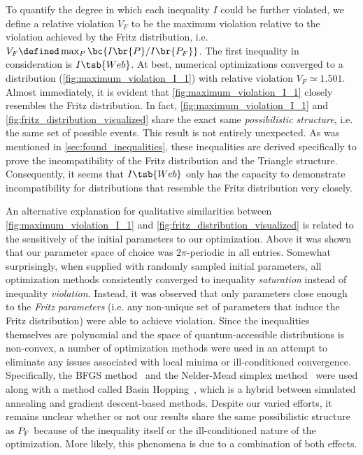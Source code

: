 \documentclass[aps, 10pt, english, twoside, pra, nofootinbib, tightenlines, longbibliography, superscriptaddress]{revtex4-1}
\begin{document}
    To quantify the degree in which each inequality $I$ could be further violated, we define a relative violation $V_F$ to be the maximum violation relative to the violation achieved by the Fritz distribution, i.e. $V_F \defined \max_{P}\bc{I\br{P}/I\br{P_F}}$. The first inequality in consideration is $I\tsb{Web}$. At best, numerical optimizations converged to a distribution (\cref{fig:maximum_violation_I_1}) with relative violation $V_F \simeq 1.501$. Almost immediately, it is evident that \cref{fig:maximum_violation_I_1} closely resembles the Fritz distribution. In fact, \cref{fig:maximum_violation_I_1} and \cref{fig:fritz_distribution_visualized} share the exact same \textit{possibilistic structure}, i.e. the same set of possible events. This result is not entirely unexpected. As was mentioned in \cref{sec:found_inequalities}, these inequalities are derived specifically to prove the incompatibility of the Fritz distribution and the Triangle structure. Consequently, it seems that $I\tsb{Web}$ only has the capacity to demonstrate incompatibility for distributions that resemble the Fritz distribution very closely.

    An alternative explanation for qualitative similarities between \cref{fig:maximum_violation_I_1} and \cref{fig:fritz_distribution_visualized} is related to the sensitively of the initial parameters to our optimization. Above it was shown that our parameter space of choice was $2\pi$-periodic in all entries. Somewhat surprisingly, when supplied with randomly sampled initial parameters, all optimization methods consistently converged to inequality \textit{saturation} instead of inequality \textit{violation}. Instead, it was observed that only parameters close enough to the \textit{Fritz parameters} (i.e. any non-unique set of parameters that induce the Fritz distribution) were able to achieve violation. Since the inequalities themselves are polynomial and the space of quantum-accessible distributions is non-convex, a number of optimization methods were used in an attempt to eliminate any issues associated with local minima or ill-conditioned convergence. Specifically, the BFGS method~\cite[p.142]{Nocedal_2000} and the Nelder-Mead simplex method~\cite[p.238]{Nocedal_2000} were used along with a method called Basin Hopping~\cite{Wales_1997}, which is a hybrid between simulated annealing and gradient descent-based methods. Despite our varied efforts, it remains unclear whether or not our results share the same possibilistic structure as $\prob[\fritz]$ because of the inequality itself or the ill-conditioned nature of the optimization. More likely, this phenomena is due to a combination of both effects.
\end{document}
